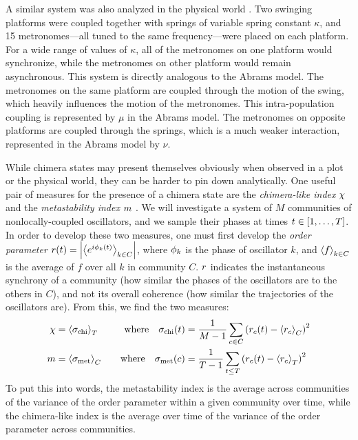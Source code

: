 A similar system was also analyzed in the physical world \cite{Martens2013}.
Two swinging platforms were coupled together with springs of variable spring constant $\kappa$, and 15 metronomes---all tuned to the same frequency---were placed on each platform.
For a wide range of values of $\kappa$, all of the metronomes on one platform would synchronize, while the metronomes on other platform would remain asynchronous.
This system is directly analogous to the Abrams model.
The metronomes on the same platform are coupled through the motion of the swing, which heavily influences the motion of the metronomes.
This intra-population coupling is represented by $\mu$ in the Abrams model.
The metronomes on opposite platforms are coupled through the springs, which is a much weaker interaction, represented in the Abrams model by $\nu$.

While chimera states may present themselves obviously when observed in a plot or the physical world, they can be harder to pin down analytically.
One useful pair of measures for the presence of a chimera state are the \textit{chimera-like index} $\chi$ and the \textit{metastability index} $m$ \cite{Shanahan2010,Hizanidis2016}.
We will investigate a system of $M$ communities of nonlocally-coupled oscillators, and we sample their phases at times $t \in \bqty{1, \ldots, T}$.
In order to develop these two measures, one must first develop the \textit{order parameter} $r(t) = \abs{\expval{e^{i \phi_{k}(t)}}_{k \in C}}$, where $\phi_{k}$ is the phase of oscillator $k$, and $\ev{f}_{k \in C}$ is the average of $f$ over all $k$ in community $C$.
$r$ indicates the instantaneous synchrony of a community (how similar the phases of the oscillators are to the others in $C$), and not its overall coherence (how similar the trajectories of the oscillators are).
From this, we find the two measures:
\begin{align}
  \label{eq:chimera}
  \chimera
  &=
    \expval{\sigma_{\text{chi}}}_{T}
  &
    \qq{where}
    \sigma_{\text{chi}}(t)
  &=
    \frac{1}{M - 1} \sum_{c \in C}\pqty{\ordparam_{c}(t) - \expval{\ordparam_{c}}_{C}}^{2} \\
  \label{eq:metastability}
  \meta
  &=
    \expval{\sigma_{\text{met}}}_{C}
  &
    \qq{where}
    \sigma_{\text{met}}(c)
  &=
    \frac{1}{T - 1} \sum_{t \leq T}\pqty{\ordparam_{c}(t) - \expval{\ordparam_{c}}_{T}}^{2}
\end{align}
To put this into words, the metastability index is the average across communities of the variance of the order parameter within a given community over time, while the chimera-like index is the average over time of the variance of the order parameter across communities.

